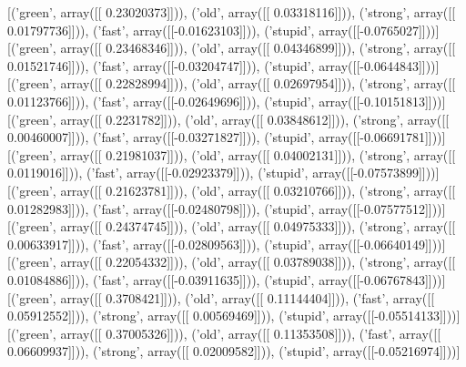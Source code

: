 [('green', array([[ 0.23020373]])), ('old', array([[ 0.03318116]])), ('strong', array([[ 0.01797736]])), ('fast', array([[-0.01623103]])), ('stupid', array([[-0.0765027]]))]
[('green', array([[ 0.23468346]])), ('old', array([[ 0.04346899]])), ('strong', array([[ 0.01521746]])), ('fast', array([[-0.03204747]])), ('stupid', array([[-0.0644843]]))]
[('green', array([[ 0.22828994]])), ('old', array([[ 0.02697954]])), ('strong', array([[ 0.01123766]])), ('fast', array([[-0.02649696]])), ('stupid', array([[-0.10151813]]))]
[('green', array([[ 0.2231782]])), ('old', array([[ 0.03848612]])), ('strong', array([[ 0.00460007]])), ('fast', array([[-0.03271827]])), ('stupid', array([[-0.06691781]]))]
[('green', array([[ 0.21981037]])), ('old', array([[ 0.04002131]])), ('strong', array([[ 0.0119016]])), ('fast', array([[-0.02923379]])), ('stupid', array([[-0.07573899]]))]
[('green', array([[ 0.21623781]])), ('old', array([[ 0.03210766]])), ('strong', array([[ 0.01282983]])), ('fast', array([[-0.02480798]])), ('stupid', array([[-0.07577512]]))]
[('green', array([[ 0.24374745]])), ('old', array([[ 0.04975333]])), ('strong', array([[ 0.00633917]])), ('fast', array([[-0.02809563]])), ('stupid', array([[-0.06640149]]))]
[('green', array([[ 0.22054332]])), ('old', array([[ 0.03789038]])), ('strong', array([[ 0.01084886]])), ('fast', array([[-0.03911635]])), ('stupid', array([[-0.06767843]]))]
[('green', array([[ 0.3708421]])), ('old', array([[ 0.11144404]])), ('fast', array([[ 0.05912552]])), ('strong', array([[ 0.00569469]])), ('stupid', array([[-0.05514133]]))]
[('green', array([[ 0.37005326]])), ('old', array([[ 0.11353508]])), ('fast', array([[ 0.06609937]])), ('strong', array([[ 0.02009582]])), ('stupid', array([[-0.05216974]]))]

